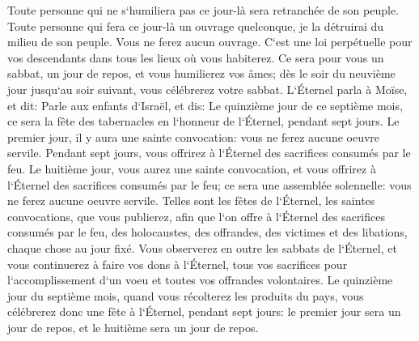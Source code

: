 \verse Toute personne qui ne s`humiliera pas ce jour-là sera retranchée de son peuple. 
\verse Toute personne qui fera ce jour-là un ouvrage quelconque, je la détruirai du milieu de son peuple. 
\verse Vous ne ferez aucun ouvrage. C`est une loi perpétuelle pour vos descendants dans tous les lieux où vous habiterez. 
\verse Ce sera pour vous un sabbat, un jour de repos, et vous humilierez vos âmes; dès le soir du neuvième jour jusqu`au soir suivant, vous célébrerez votre sabbat. 
\verse L`Éternel parla à Moïse, et dit: 
\verse Parle aux enfants d`Israël, et dis: Le quinzième jour de ce septième mois, ce sera la fête des tabernacles en l`honneur de l`Éternel, pendant sept jours. 
\verse Le premier jour, il y aura une sainte convocation: vous ne ferez aucune oeuvre servile. 
\verse Pendant sept jours, vous offrirez à l`Éternel des sacrifices consumés par le feu. Le huitième jour, vous aurez une sainte convocation, et vous offrirez à l`Éternel des sacrifices consumés par le feu; ce sera une assemblée solennelle: vous ne ferez aucune oeuvre servile. 
\verse Telles sont les fêtes de l`Éternel, les saintes convocations, que vous publierez, afin que l`on offre à l`Éternel des sacrifices consumés par le feu, des holocaustes, des offrandes, des victimes et des libations, chaque chose au jour fixé. 
\verse Vous observerez en outre les sabbats de l`Éternel, et vous continuerez à faire vos dons à l`Éternel, tous vos sacrifices pour l`accomplissement d`un voeu et toutes vos offrandes volontaires. 
\verse Le quinzième jour du septième mois, quand vous récolterez les produits du pays, vous célébrerez donc une fête à l`Éternel, pendant sept jours: le premier jour sera un jour de repos, et le huitième sera un jour de repos. 

